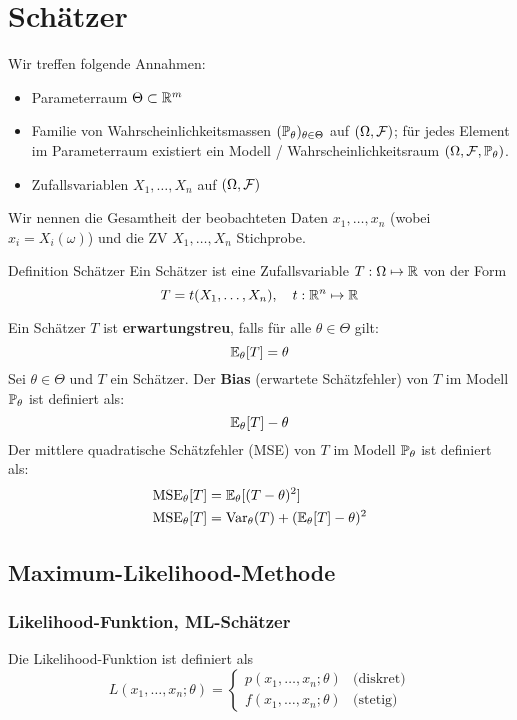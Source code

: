 \section{Schätzer}

Wir treffen folgende Annahmen:
\begin{itemize}
	\item Parameterraum \(\Theta \subset \R^m\)
	\item Familie von Wahrscheinlichkeitsmassen \((\P_\theta)_{\theta \in \Theta}\) auf \((\Omega, \F)\); 
    für jedes Element im Parameterraum existiert ein Modell / Wahrscheinlichkeitsraum $(\Omega, \F, \P_{\theta})$.
	\item Zufallsvariablen \(X_1, \ldots, X_n\) auf \((\Omega, \F)\)
\end{itemize}
Wir nennen die Gesamtheit der beobachteten Daten \(x_1, \ldots, x_n\) (wobei $x_i = X_i(\omega)$) und die ZV \(X_1, \ldots, X_n\) Stichprobe.
\begin{mainbox}{Definition Schätzer}
	Ein Schätzer ist eine Zufallsvariable \(T: \Omega \mapsto \R\) von der Form
	\[T = t(X_1, \ldots, X_n), \quad t: \R^n \mapsto \R\]
\end{mainbox}
Ein Schätzer \(T\) ist \textbf{erwartungstreu}, falls für alle \(\theta \in \Theta\) gilt:
\[\E_\theta [T] = \theta\]
Sei \(\theta \in \Theta\) und \(T\) ein Schätzer. Der \textbf{Bias} (erwartete Schätzfehler) von \(T\) im Modell \(\P_\theta\) ist definiert als:
\[\E_\theta[T]-\theta\]
Der mittlere quadratische Schätzfehler (MSE) von \(T\) im Modell \(\P_\theta\) ist definiert als:
\begin{align*}
	\text{MSE}_\theta[T] & = \E_\theta[(T-\theta)^2]                    \\
	\text{MSE}_\theta[T] & = \Var_\theta(T) + (\E_\theta[T] - \theta)^2
\end{align*}

\subsection{Maximum-Likelihood-Methode}
\subsubsection{Likelihood-Funktion, ML-Schätzer}
Die Likelihood-Funktion ist definiert als
\[L(x_1, \ldots, x_n; \theta) = \begin{cases}
		p(x_1, \ldots, x_n; \theta) & \text{(diskret)} \\
		f(x_1, \ldots, x_n; \theta) & \text{(stetig)}
	\end{cases} \]

